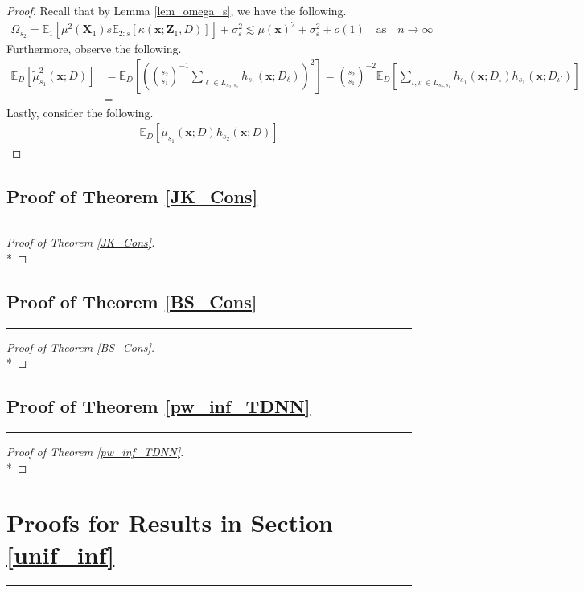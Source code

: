 \documentclass[letterpaper,10pt]{article}
\numberwithin{equation}{section}
\numberwithin{thm}{section}
\numberwithin{lem}{section}
\numberwithin{cor}{section}
\newcommand{\E}{\mathbb{E}}
\newcommand{\1}{\mathbbm{1}}
\begin{document}
\begin{proof}
	Recall that by Lemma \ref{lem_omega_s}, we have the following.
	\begin{equation}
		\begin{aligned}
			\Omega_{s_2}
			= \E_1\left[\mu^2\left(\mathbf{X}_1\right) s \E_{2:s}\left[\kappa\left(\mathbf{x}; \mathbf{Z}_1, D\right)\right]\right] + \sigma_{\varepsilon}^2
			\lesssim \mu(\mathbf{x})^2 + \sigma_{\varepsilon}^2 + o(1)
			\quad \text{as} \quad n \rightarrow \infty
		\end{aligned}
	\end{equation}
	Furthermore, observe the following.
	\begin{equation}
		\begin{aligned}
			\E_{D}\left[\tilde{\mu}_{s_1}^{2}\left(\mathbf{x}; D\right)\right]
			 & = \E_D\left[\left(\binom{s_2}{s_1}^{-1}\sum_{\ell \in L_{s_2, s_1}} h_{s_1}\left(\mathbf{x}; D_{\ell}\right)\right)^2\right]
			= \binom{s_2}{s_1}^{-2} \E_{D}\left[\sum_{\iota, \iota' \in L_{s_2, s_1}}h_{s_1}\left(\mathbf{x}; D_{\iota}\right)h_{s_1}\left(\mathbf{x}; D_{\iota'}\right)\right] \\
			 & =
		\end{aligned}
	\end{equation}
	Lastly, consider the following.
	\begin{equation}
		\begin{aligned}
			\E_{D}\left[\tilde{\mu}_{s_1}\left(\mathbf{x}; D\right) h_{s_2}\left(\mathbf{x}; D\right)\right]
		\end{aligned}
	\end{equation}
\end{proof}

\subsection{Proof of Theorem \ref{JK_Cons}}
\hrule

\begin{proof}[Proof of Theorem \ref{JK_Cons}]\mbox{}\\*

\end{proof}

\subsection{Proof of Theorem \ref{BS_Cons}}
\hrule

\begin{proof}[Proof of Theorem \ref{BS_Cons}]\mbox{}\\*

\end{proof}

\subsection{Proof of Theorem \ref{pw_inf_TDNN}}
\hrule

\begin{proof}[Proof of Theorem \ref{pw_inf_TDNN}]\mbox{}\\*

\end{proof}

\section{Proofs for Results in Section \ref{unif_inf}}
\hrule
\end{document}
